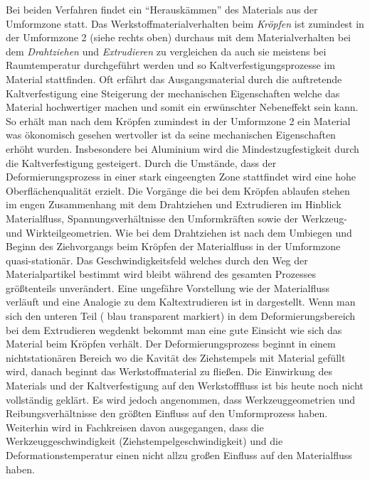\documentclass[12pt,a4paper,parskip,twoside,BCOR5mm,headsepline]{scrartcl}
\begin{document}
\begin{description*}
Bei beiden Verfahren findet ein "`Herauskämmen"' des Materials aus der Umformzone statt. Das Werkstoffmaterialverhalten beim \emph{Kröpfen} ist zumindest in der Umformzone 2 (siehe  rechts oben) durchaus mit dem Materialverhalten bei dem \emph{Drahtziehen} und \emph{Extrudieren} zu vergleichen da auch sie meistens bei Raumtemperatur durchgeführt werden und so Kaltverfestigungsprozesse im Material stattfinden. Oft erfährt das Ausgangsmaterial durch die auftretende Kaltverfestigung        
eine Steigerung der mechanischen Eigenschaften welche das Material hochwertiger machen und somit ein erwünschter Nebeneffekt sein kann. So erhält man nach dem Kröpfen zumindest in der Umformzone 2 ein Material was ökonomisch gesehen wertvoller ist da seine mechanischen Eigenschaften erhöht wurden. Insbesondere bei Aluminium wird die Mindestzugfestigkeit durch die Kaltverfestigung gesteigert. Durch die Umstände, dass der Deformierungsprozess in einer stark eingeengten Zone stattfindet wird eine hohe Oberflächenqualität erzielt. Die Vorgänge die bei dem Kröpfen ablaufen stehen im engen Zusammenhang mit dem Drahtziehen und Extrudieren im Hinblick  Materialfluss, Spannungsverhältnisse den Umformkräften sowie der Werkzeug- und Wirkteilgeometrien. Wie bei dem Drahtziehen ist nach dem Umbiegen und Beginn des Ziehvorgangs beim Kröpfen der Materialfluss in der Umformzone quasi-stationär. Das Geschwindigkeitsfeld welches durch den Weg der Materialpartikel bestimmt wird bleibt während des gesamten Prozesses größtenteils unverändert. Eine ungefähre Vorstellung wie der Materialfluss verläuft und  eine Analogie zu dem Kaltextrudieren ist in  dargestellt. Wenn man sich den unteren Teil ( blau transparent markiert) in dem Deformierungsbereich bei dem Extrudieren wegdenkt bekommt man  eine gute Einsicht wie sich das Material beim Kröpfen verhält. Der Deformierungsprozess beginnt in einem nichtstationären Bereich wo die Kavität des Ziehstempels mit Material gefüllt wird, danach beginnt das  Werkstoffmaterial zu fließen. Die Einwirkung des Materials und der Kaltverfestigung auf den Werkstofffluss ist bis heute noch nicht vollständig geklärt. Es wird jedoch angenommen, dass  
Werkzeuggeometrien und Reibungsverhältnisse den größten Einfluss auf den Umformprozess haben. Weiterhin wird in Fachkreisen davon ausgegangen, dass die Werkzeuggeschwindigkeit (Ziehstempelgeschwindigkeit) und die Deformationstemperatur einen nicht allzu großen Einfluss auf den Materialfluss haben.\autocite[13.10]{kl} 



\end{description*}
\end{document}
